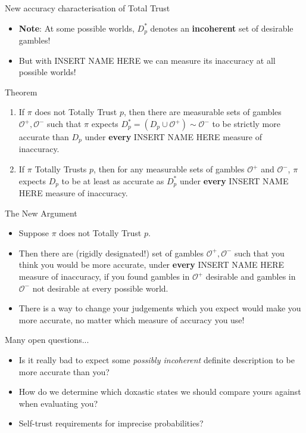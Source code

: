 \documentclass[aspectratio=169, dvipsnames]{beamer}
\newcommand{\Oset}{\mathcal{O}}
\begin{document}
\begin{frame}{New accuracy characterisation of Total Trust}
  \begin{itemize}
  \item \textbf{Note}: At some possible worlds, $D_p^*$ denotes an \alert{\textbf{incoherent}} set of desirable gambles!
  \item But with INSERT NAME HERE we can measure its inaccuracy at all possible worlds!
  \end{itemize}
  \begin{block}{Theorem}
    \begin{enumerate}
      \item If $\pi$ does not Totally Trust $p$, then there are measurable sets of gambles $\Oset^+, \Oset^-$ such that
        $\pi$ expects $D_p^* = (D_p \cup \Oset^+) \sim \Oset^-$ to be strictly more accurate than $D_p$ under \alert{\textbf{every}}
        INSERT NAME HERE measure of inaccuracy.
      \item If $\pi$ Totally Trusts $p$, then for any measurable sets of gambles $\Oset^+$ and $\Oset^-$, $\pi$ expects $D_p$
        to be at least as accurate as $D_p^*$ under \alert{\textbf{every}} INSERT NAME HERE measure of inaccuracy.
    \end{enumerate}
  \end{block}
\end{frame}

\begin{frame}{The New Argument}
  \begin{itemize}
  \item Suppose $\pi$ does not Totally Trust $p$.
  \item Then there are (rigidly designated!) set of gambles $\Oset^+, \Oset^-$ such that you think you would be more accurate,
    under \textbf{\alert{every}} INSERT NAME HERE measure of inaccuracy, if you found gambles in $\Oset^+$ desirable and
    gambles in $\Oset^-$ not desirable at every possible world.
  \item There is a way to change your judgements which you expect would make you more accurate, no matter which measure of
    accuracy you use!
  \end{itemize}
\end{frame}

\begin{frame}{Many open questions...}
  \begin{itemize}
  \item Is it really bad to expect some \textit{possibly incoherent} definite description to be more accurate than you? 
  \item How do we determine which doxastic states we should compare yours against when evaluating you?
  \item Self-trust requirements for imprecise probabilities?
  \end{itemize}
  
\end{frame}
\end{document}
